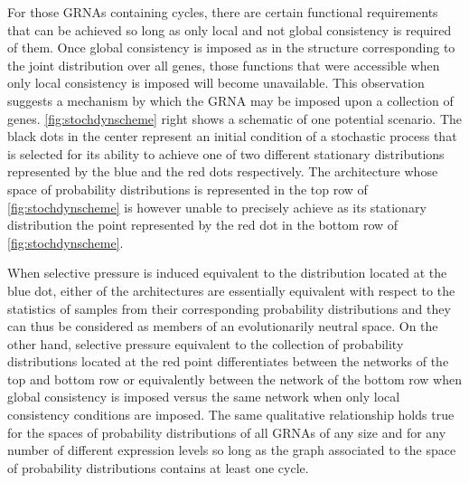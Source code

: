 For those GRNAs containing cycles, there are certain functional requirements that can be achieved so long as only local and not global consistency is required of them. Once global consistency is imposed as in the structure corresponding to the joint distribution over all genes, those functions that were accessible when only local consistency is imposed will become unavailable. This observation suggests a mechanism by which the GRNA may be imposed upon a collection of genes. \ref{fig:stochdynscheme} right shows a schematic of one potential scenario. The black dots in the center represent an initial condition of a stochastic process that is selected for its ability to achieve one of two different stationary distributions represented by the blue and the red dots respectively. The architecture whose space of probability distributions is represented in the top row of \ref{fig:stochdynscheme} is however unable to precisely achieve as its stationary distribution the point represented by the red dot in the bottom row of \ref{fig:stochdynscheme}.

When selective pressure is induced equivalent to the distribution located at the blue dot, either of the architectures are essentially equivalent with respect to the statistics of samples from their corresponding probability distributions and they can thus be considered as members of an evolutionarily neutral space. On the other hand, selective pressure equivalent to the collection of probability distributions located at the red point differentiates between the networks of the top and bottom row or equivalently between the network of the bottom row when global consistency is imposed versus the same network when only local consistency conditions are imposed. The same qualitative relationship holds true for the spaces of probability distributions of all GRNAs of any size and for any number of different expression levels so long as the graph associated to the space of probability distributions contains at least one cycle.

